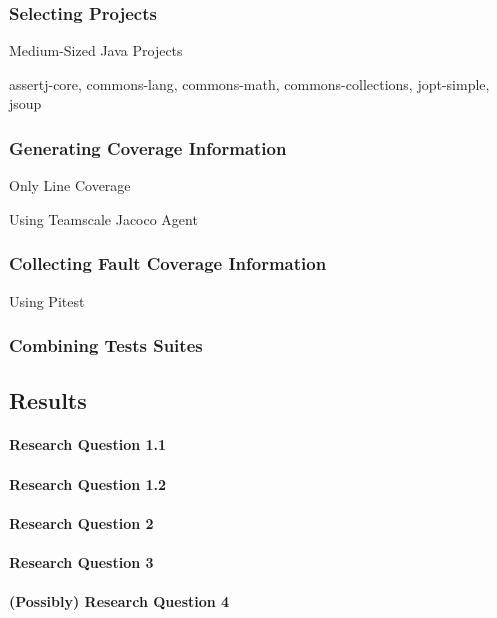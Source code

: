 \documentclass[a4paper,10pt]{article}
\begin{document}
\subsubsection{Selecting Projects}

Medium-Sized Java Projects

assertj-core, commons-lang, commons-math, commons-collections, jopt-simple, jsoup

\subsubsection{Generating Coverage Information}

Only Line Coverage

Using Teamscale Jacoco Agent

\subsubsection{Collecting Fault Coverage Information}

Using Pitest

\subsubsection{Combining Tests Suites}

\subsection{Results}

\paragraph{Research Question 1.1}

\paragraph{Research Question 1.2}

\paragraph{Research Question 2}

\paragraph{Research Question 3}

\paragraph{(Possibly) Research Question 4}
\end{document}
